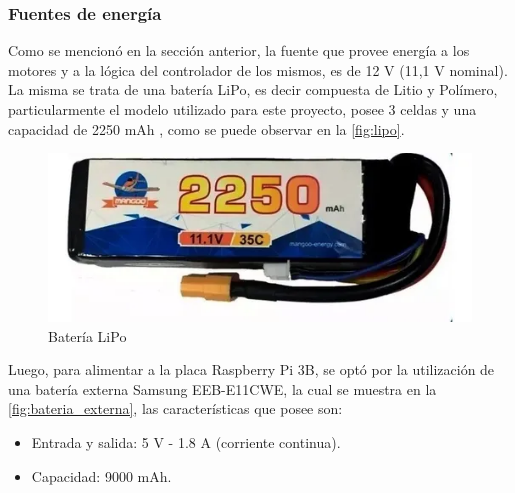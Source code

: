 \documentclass[11pt,a4paper]{article}
\begin{document}
	
	\subsubsection{Fuentes de energía}
	Como se mencionó en la sección anterior, la fuente que provee energía a los motores y a la lógica del controlador de los mismos, es de 12 V (11,1 V nominal). La misma se trata de una batería LiPo, es decir compuesta de Litio y Polímero, particularmente el modelo utilizado para este proyecto, posee 3 celdas y una capacidad de 2250 mAh \cite{lipo}, como se puede observar en la \autoref*{fig:lipo}.
	
	\begin{figure}[h!]
		\centering
		\includegraphics[width=0.7\linewidth]{imagenes/lipo}
		\caption{Batería LiPo}
		\label{fig:lipo}
	\end{figure}
	
	Luego, para alimentar a la placa Raspberry Pi 3B, se optó por la utilización de una batería externa Samsung EEB-E11CWE, la cual se muestra en la \autoref*{fig:bateria_externa}, las características que posee son: 
	
	\begin{itemize}
		\item Entrada y salida: 5 V - 1.8 A (corriente continua).
		\item Capacidad: 9000 mAh.
	\end{itemize} 
	
\end{document}
